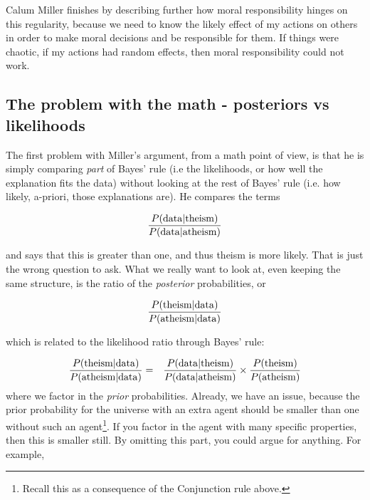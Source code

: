 Calum Miller finishes by describing further how moral responsibility hinges on this regularity, because we need to know the likely effect of my actions on others in order to make moral decisions and be responsible for them. If things were chaotic, if my actions had random effects, then moral responsibility could not work.

\subsection{The problem with the math - posteriors vs
likelihoods}\label{the-problem-with-the-math---posteriors-vs-likelihoods}

The first problem with Miller's argument, from a math point of view, is that he is simply comparing {\em part} of Bayes' rule (i.e the likelihoods, or how well the explanation fits the data) without looking at the rest of Bayes' rule (i.e. how likely, a-priori, those explanations are).  He compares the terms

\begin{eqnarray*}
\frac{P({\rm data}|{\rm theism})}{P({\rm data}|{\rm atheism})}
\end{eqnarray*}

and says that this is greater than one, and thus theism is more
likely. That is just the wrong question to ask. What we really want to
look at, even keeping the same structure, is the ratio of the
\emph{posterior} probabilities, or

\begin{eqnarray*}
\frac{P({\rm theism}|{\rm data})}{P({\rm atheism}|{\rm data})}
\end{eqnarray*}

which is related to the likelihood ratio through Bayes' rule:

\begin{eqnarray*}
\frac{P({\rm theism}|{\rm data})}{P({\rm atheism}|{\rm data})} &=& \frac{P({\rm data}|{\rm theism})}{P({\rm data}|{\rm atheism})} \times \frac{P({\rm theism})}{P({\rm atheism})}
\end{eqnarray*}
where we factor in the \emph{prior} probabilities. Already, we have an
issue, because the prior probability for the universe with an extra
agent should be smaller than one without such an agent\footnote{Recall this as a consequence of the Conjunction rule above.}. If you factor in
the agent with many specific properties, then this is smaller still.
By omitting this part, you could argue for anything. For example,


